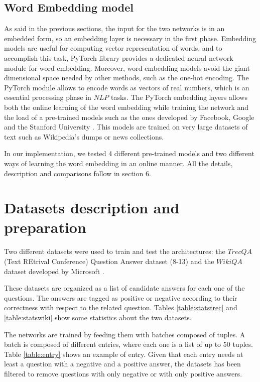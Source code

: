 \documentclass[11pt,a4paper]{article}
\begin{document}
\subsection{Word Embedding model}
As said in the previous sections, the input for the two networks is in an embedded form, so an embedding layer is necessary in the first phase. Embedding models are useful for computing vector representation of words, and to accomplish this task, PyTorch library provides a dedicated neural network module for word embedding. Moreover, word embedding models avoid the giant dimensional space needed by other methods, such as the one-hot encoding.
The PyTorch module allows to encode words as vectors of real numbers, which is an essential processing phase in $NLP$ tasks.
The PyTorch embedding layers allows both the online learning of the word embedding while training the network and the load of a pre-trained models such as the ones developed by Facebook, Google and the Stanford University \cite{w2v} \cite{glove} \cite{wiki}. This models are trained on very large datasets of text such as Wikipedia's dumps or news collections.

In our implementation, we tested 4 different pre-trained models and two different ways of learning the word embedding in an online manner. All the details, description and comparisons follow in section 6.

\section{Datasets description and preparation}

Two different datasets were used to train and test the architectures: the $TrecQA$ (Text REtrival Conference) Question Answer dataset (8-13) \cite{trec} and the $WikiQA$ dataset developed by Microsoft \cite{wikids}.

These datasets are organized as a list of candidate answers for each one of the questions. The answers are tagged as positive or negative according to their correctness with respect to the related question. Tables \ref{table:statstrec} and \ref{table:statswiki} show some statistics about the two datasets.

The networks are trained by feeding them with batches composed of tuples. A batch is composed of different entries, where each one is a list of up to $50$ tuples. Table \ref{table:entry} shows an example of entry. Given that each entry needs at least a question with a negative and a positive answer, the datasets has been filtered to remove questions with only negative or with only positive answers.
\end{document}
